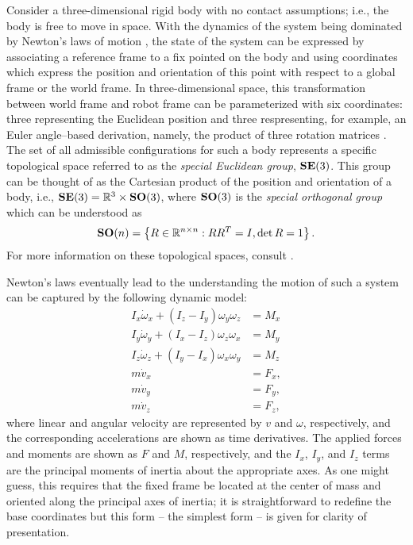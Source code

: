 Consider a three-dimensional rigid body with no contact assumptions; i.e., the body is free to move in space.
%
With the dynamics of the system being dominated by Newton's laws of motion \cite{feynman1963}, the state of the system can be expressed by associating a reference frame to a fix pointed on the body and using coordinates which express the position and orientation of this point with respect to a global frame or the world frame.
%
In three-dimensional space, this transformation between world frame and robot frame can be parameterized with six coordinates: three representing the Euclidean position and three respresenting, for example, an Euler angle--based derivation, namely, the product of three rotation matrices \cite{Baruh98}.
%
The set of all admissible configurations for such a body represents a specific topological space referred to as the {\em special Euclidean group}, $\mathbf{SE}(3)$.
%
This group can be thought of as the Cartesian product of the position and orientation of a body, i.e., $\mathbf{SE}(3) = \mathbb{R}^3 \times \mathbf{SO}(3)$, where $\mathbf{SO}(3)$ is the {\em special orthogonal group} which can be understood as
\begin{align*}
  \mathbf{SO}(n) = \left\{ R \in \mathbb{R}^{n \times n} : R R^T = I, \det R = 1 \right\}.
\end{align*}
For more information on these topological spaces, consult \cite{MLS94}.


Newton's laws eventually lead to the understanding the motion of such a system can be captured by the following dynamic model:
\begin{align}
  \nonumber
  I_{x} \dot{\omega}_{x} + (I_{z} - I_{y}) \omega_{y} \omega_{z} &= M_{x}\\
  \nonumber
  I_{y} \dot{\omega}_{y} + (I_{x} - I_{z}) \omega_{z} \omega_{x} &= M_{y}\\
  \nonumber
  I_{z} \dot{\omega}_{z} + (I_{y} - I_{x}) \omega_{x} \omega_{y} &= M_{z}\\
  \nonumber
  m \dot{v}_{x} &= F_{x},\\
  \nonumber
  m \dot{v}_{y} &= F_{y},\\
  m \dot{v}_{z} &= F_{z},
\end{align}
where linear and angular velocity are represented by $v$ and $\omega$, respectively, and the corresponding accelerations are shown as time derivatives.
%
The applied forces and moments are shown as $F$ and $M$, respectively, and the $I_{x}$, $I_{y}$, and $I_{z}$ terms are the principal moments of inertia about the appropriate axes.
%
As one might guess, this requires that the fixed frame be located at the center of mass and oriented along the principal axes of inertia; it is straightforward to redefine the base coordinates but this form -- the simplest form -- is given for clarity of presentation.

